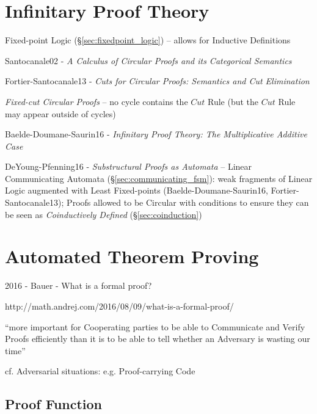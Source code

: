 \section{Infinitary Proof Theory}\label{sec:infinitary_proof_theory}

\fist Fixed-point Logic (\S\ref{sec:fixedpoint_logic}) -- allows for
Inductive Definitions

Santocanale02 - \emph{A Calculus of Circular Proofs and its
  Categorical Semantics}

Fortier-Santocanale13 - \emph{Cuts for Circular Proofs: Semantics and
  Cut Elimination}

\emph{Fixed-cut Circular Proofs} -- no cycle contains the $Cut$ Rule
(but the $Cut$ Rule may appear outside of cycles)

Baelde-Doumane-Saurin16 - \emph{Infinitary Proof Theory: The
  Multiplicative Additive Case}

DeYoung-Pfenning16 - \emph{Substructural Proofs as Automata} -- Linear
Communicating Automata (\S\ref{sec:communicating_fsm}): weak
fragments of Linear Logic augmented with Least Fixed-points
(Baelde-Doumane-Saurin16, Fortier-Santocanale13); Proofs allowed to be
Circular with conditions to ensure they can be seen as
\emph{Coinductively Defined} (\S\ref{sec:coinduction})



\section{Automated Theorem Proving}\label{sec:atp}

2016 - Bauer - What is a formal proof?

http://math.andrej.com/2016/08/09/what-is-a-formal-proof/

``more important for Cooperating parties to be able to Communicate and
Verify Proofs efficiently than it is to be able to tell whether an
Adversary is wasting our time''

cf. Adversarial situations: e.g. Proof-carrying Code %



\subsection{Proof Function}\label{sec:proof_function}

